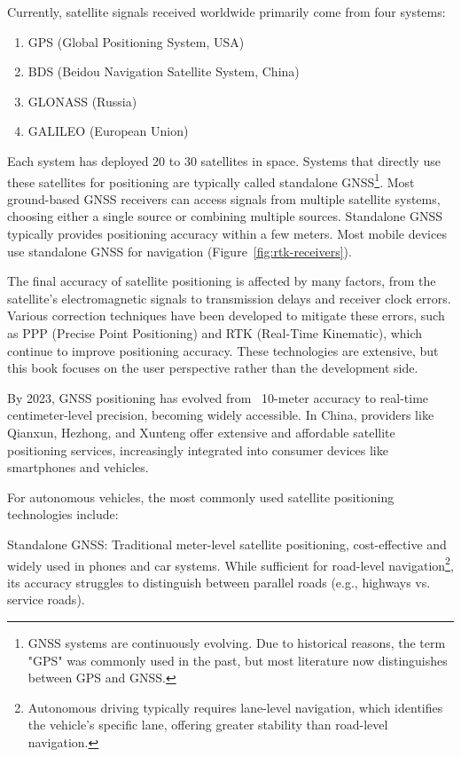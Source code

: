 Currently, satellite signals received worldwide primarily come from four systems:

\begin{enumerate}
	\item GPS (Global Positioning System, USA)
	
	\item BDS (Beidou Navigation Satellite System, China)
	
	\item GLONASS (Russia)
	
	\item GALILEO (European Union)
\end{enumerate}


Each system has deployed 20 to 30 satellites in space. Systems that directly use these satellites for positioning are typically called standalone GNSS\footnote{GNSS systems are continuously evolving. Due to historical reasons, the term "GPS" was commonly used in the past, but most literature now distinguishes between GPS and GNSS.}. Most ground-based GNSS receivers can access signals from multiple satellite systems, choosing either a single source or combining multiple sources. Standalone GNSS typically provides positioning accuracy within a few meters. Most mobile devices use standalone GNSS for navigation (Figure~\ref{fig:rtk-receivers}).

The final accuracy of satellite positioning is affected by many factors, from the satellite's electromagnetic signals to transmission delays and receiver clock errors. Various correction techniques have been developed to mitigate these errors, such as PPP (Precise Point Positioning) and RTK (Real-Time Kinematic), which continue to improve positioning accuracy. These technologies are extensive, but this book focuses on the user perspective rather than the development side.

By 2023, GNSS positioning has evolved from ~10-meter accuracy to real-time centimeter-level precision, becoming widely accessible. In China, providers like Qianxun, Hezhong, and Xunteng offer extensive and affordable satellite positioning services, increasingly integrated into consumer devices like smartphones and vehicles.

For autonomous vehicles, the most commonly used satellite positioning technologies include:

Standalone GNSS: Traditional meter-level satellite positioning, cost-effective and widely used in phones and car systems. While sufficient for road-level navigation\footnote{Autonomous driving typically requires lane-level navigation, which identifies the vehicle's specific lane, offering greater stability than road-level navigation.}, its accuracy struggles to distinguish between parallel roads (e.g., highways vs. service roads).

